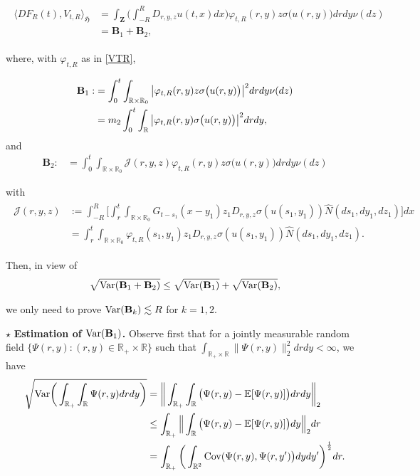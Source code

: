 \documentclass[letterpaper, 11pt,  reqno]{amsart}
\newcommand{\wh}{\widehat}
\newcommand{\noi}{\noindent}
\newcommand{\R}{\mathbb{R}}
\newcommand{\E}{\mathbb{E}}
\newcommand{\s}{\sigma}
\newcommand{\les}{\lesssim}
\newcommand{\jb}[1]
{\langle #1 \rangle}
\newcommand{\Var}{\textup{Var}}
\newcommand{\fH}{\mathfrak{H}}
\numberwithin{equation}{section}
\numberwithin{theorem}{section}
\begin{document}
\noi
\begin{align} \label{B_decomp}
\begin{aligned}
 \jb{ DF_R(t),  V_{t, R} }_\fH 
 &=    \int_{\mathbf{Z}}  \bigg(\int_{-R}^R D_{r, y, z} u(t,x) dx \bigg) 
 \varphi_{t, R}(r,y) z  \s\big( u(r, y) \big) drdy \nu(dz) \\
  &=   \mathbf{B}_1 +  \mathbf{B}_2 ,
\end{aligned}
\end{align}

\noi
where,  with $\varphi_{t,R}$ as in \eqref{VTR},

\noi
\begin{align}  \notag%
 \mathbf{B}_1:&= \int_{0}^t \int_{\R\times\R_0} \big|  \varphi_{t, R}(r,y) z  \s\big( u(r, y) \big) \big|^2 
 drdy \nu(dz)  \notag  \\
 &= m_2\int_{0}^t \int_{\R} \big|  \varphi_{t, R}(r,y)   \s\big( u(r, y) \big) \big|^2 
 drdy   ,    \notag%
\end{align}
and 
\begin{align}  
 \mathbf{B}_2:&= 
 \int_{0}^t \int_{\R\times\R_0}
\mathcal{J}(r, y, z)   \varphi_{t, R}(r,y) z  \s\big( u(r, y) \big) 
 drdy \nu(dz)  \label{B12b}
\end{align}

\noi
with
\begin{align}   \label{def_cJ}
\begin{aligned} 
\mathcal{J}(r, y, z) &:= 
\int_{-R}^R\bigg[  \int_{r}^t \int_{\R\times\R_0} G_{t-s_1}(x-y_1)z_1 D_{r,y,z} \s( u(s_1, y_1)) 
 \wh{N}(ds_1,dy_1, dz_1) \bigg] dx \\
 &= \int_{r}^t \int_{\R\times\R_0}   \varphi_{t, R}(s_1, y_1)   z_1 D_{r,y,z} \s( u(s_1, y_1)) 
 \wh{N}(ds_1,dy_1, dz_1).
\end{aligned}
\end{align}

\noi
Then, in view of 
\begin{align}\label{VAR_sum}
\sqrt{ \Var(  \mathbf{B}_1 + \mathbf{B}_2 )} \leq  \sqrt{ \Var(  \mathbf{B}_1   )  }
+  \sqrt{ \Var(  \mathbf{B}_2 )},
\end{align} 

\noi
we only need to prove 
$\Var(  \mathbf{B}_k) \les R$ for $k=1,2$.

\smallskip

 
 $\star$ {\bf Estimation of  $  \Var(  \mathbf{B}_1) $.} 
 Observe first that for a jointly measurable 
 random field  $\{ \Psi(r,y): (r,y)\in\R_+\times\R\}$
 such that $\int_{\R_+\times\R} \| \Psi(r,y)\|_2^2 drdy <\infty$,
 we have 
 \begin{align}\label{VAR0}
  \begin{aligned}
 \sqrt{ \Var \bigg(  \int_{\R_+} \int_\R \Psi(r,y) dr dy\bigg) }
 &= \bigg\|  \int_{\R_+} \int_\R  \big( \Psi(r,y) - \E[ \Psi(r,y) ] \big) dr dy \bigg\|_2 \\
 &\leq  \int_{\R_+}  \Big\|  \int_\R  \big( \Psi(r,y) - \E[ \Psi(r,y) ] \big) dy \Big\|_2 dr  \\
 & =   \int_{\R_+}   \bigg(  \int_{\R^2} {\rm Cov}( \Psi(r,y),  \Psi(r,y')    \big) dy dy' \bigg)^{\frac12} dr.
 \end{aligned} 
 \end{align} 
\end{document}
